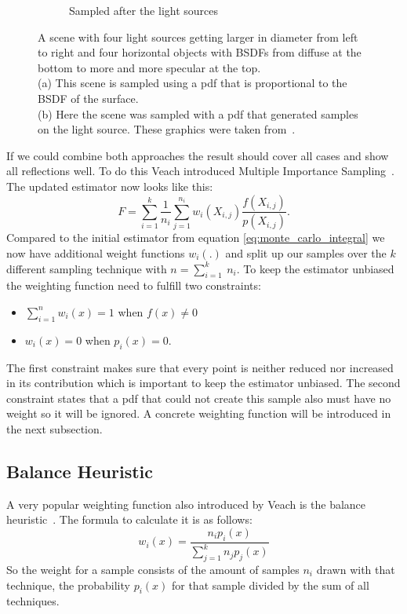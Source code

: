 \begin{figure}
\begin{subfigure}[b]{0.45\textwidth}
        \caption{Sampled after the light sources}
        \label{fig:veach_mis_light}
    \end{subfigure}
    \caption{A scene with four light sources getting larger in diameter from left to right
    and four horizontal objects with BSDFs from diffuse at the bottom to more and more specular at the top.\\
    (a) This scene is sampled using a pdf that is proportional to the BSDF of the surface.\\
    (b) Here the scene was sampled with a pdf that generated samples on the light source.
    These graphics were taken from~\cite[Figure~9.2]{veach-thesis}.}
    \label{fig:veach_mis_single}
\end{figure}

If we could combine both approaches the result should cover all cases and show all reflections well.
To do this Veach introduced Multiple Importance Sampling~\cite[Chapter~9]{veach-thesis}.
The updated estimator now looks like this: $$ F = \sum_{i = 1}^k \frac{1}{n_i} \sum_{j = 1}^{n_i} w_i(X_{i,j}) \frac{f(X_{i,j})}{p(X_{i,j})}. $$
Compared to the initial estimator from equation \ref{eq:monte_carlo_integral} we now have additional weight functions $ w_i(.) $
and split up our samples over the $ k $ different sampling technique with $ n = \sum_{i = 1}^k~n_i $.
To keep the estimator unbiased the weighting function need to fulfill two constraints:
\begin{itemize}
    \item $ \sum_{i = 1}^n w_i(x) = 1 $ when $ f(x) \neq 0 $
    \item $ w_i(x) = 0 $ when $ p_i(x) = 0 $.
\end{itemize}
The first constraint makes sure that every point is neither reduced nor increased in its contribution
which is important to keep the estimator unbiased.
The second constraint states that a pdf that could not create this sample also must have no weight
so it will be ignored.
A concrete weighting function will be introduced in the next subsection.


\subsection{Balance Heuristic}
\label{sec:balance_heuristic}
A very popular weighting function also introduced by Veach is the balance heuristic~\cite[Chapter~9.2.2]{veach-thesis}.
The formula to calculate it is as follows: $$ w_i(x) = \frac{n_i p_i(x)}{\sum_{j = 1}^k n_j p_j(x)} $$
So the weight for a sample consists of the amount of samples $ n_i $ drawn with that technique,
the probability $ p_i(x) $ for that sample divided by the sum of all techniques.


